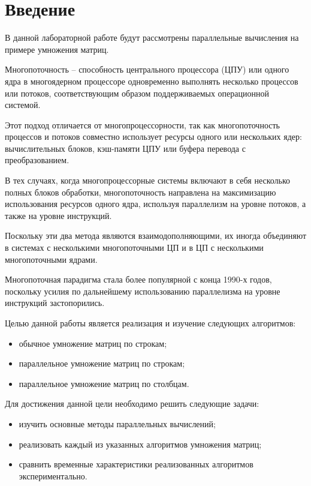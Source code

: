 \chapter*{Введение}

В данной лабораторной работе будут рассмотрены параллельные вычисления на примере умножения матриц.

Многопоточность -- способность центрального процессора (ЦПУ) или одного ядра в многоядерном процессоре одновременно выполнять несколько процессов или потоков, соответствующим образом поддерживаемых операционной системой.

Этот подход отличается от многопроцессорности, так как многопоточность процессов и потоков совместно использует ресурсы одного или нескольких ядер: вычислительных блоков, кэш-памяти ЦПУ или буфера перевода с преобразованием.

В тех случаях, когда многопроцессорные системы включают в себя несколько полных блоков обработки, многопоточность направлена на максимизацию использования ресурсов одного ядра, используя параллелизм на уровне потоков, а также на уровне инструкций.

Поскольку эти два метода являются взаимодополняющими, их иногда объединяют в системах с несколькими многопоточными ЦП и в ЦП с несколькими многопоточными ядрами.

Многопоточная парадигма стала более популярной с конца 1990-х годов, поскольку усилия по дальнейшему использованию параллелизма на уровне инструкций застопорились.

Целью данной работы является реализация и изучение следующих алгоритмов:
\begin{itemize}
	\item обычное умножение матриц по строкам;
	\item параллельное умножение матриц по строкам;
	\item параллельное умножение матриц по столбцам.
\end{itemize}

Для достижения данной цели необходимо решить следующие задачи:

\begin{itemize}
	\item изучить основные методы параллельных вычислений;
	\item реализовать каждый из указанных алгоритмов умножения матриц;
	\item сравнить временные характеристики реализованных алгоритмов экспериментально.
\end{itemize}
